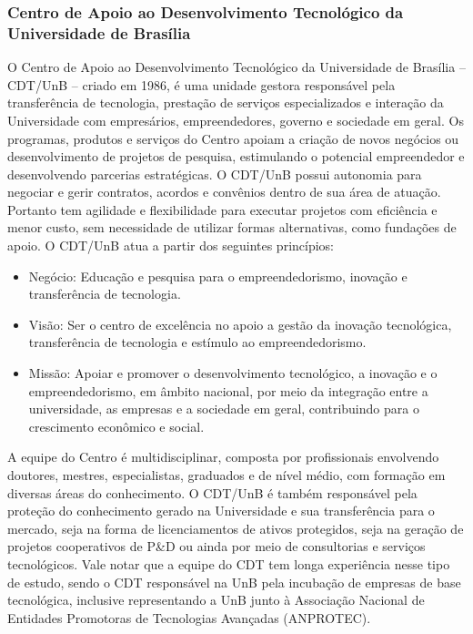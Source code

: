 \subsubsection*{Centro de Apoio ao Desenvolvimento Tecnológico da Universidade de Brasília}
O Centro de Apoio ao Desenvolvimento Tecnológico da Universidade de Brasília –
CDT/UnB – criado em 1986, é uma unidade gestora responsável pela transferência
de tecnologia, prestação de serviços especializados e interação da Universidade
com empresários, empreendedores, governo e sociedade em geral. Os programas,
produtos e serviços do Centro apoiam a criação de novos negócios ou
desenvolvimento de projetos de pesquisa, estimulando o potencial empreendedor e
desenvolvendo parcerias estratégicas.  O CDT/UnB possui autonomia para negociar
e gerir contratos, acordos e convênios dentro de sua área de atuação. Portanto
tem agilidade e flexibilidade para executar projetos com eficiência e menor
custo, sem necessidade de utilizar formas alternativas, como fundações de
apoio.  O CDT/UnB atua a partir dos seguintes princípios:

\begin{itemize}

\item Negócio: Educação e pesquisa para o empreendedorismo, inovação e
transferência de tecnologia.

\item Visão: Ser o centro de excelência no apoio a gestão da inovação
tecnológica, transferência de tecnologia e estímulo ao empreendedorismo.

\item Missão: Apoiar e promover o desenvolvimento tecnológico, a inovação e o
empreendedorismo, em âmbito nacional, por meio da integração entre a
universidade, as empresas e a sociedade em geral, contribuindo para o
crescimento econômico e social.

\end{itemize}

A equipe do Centro é multidisciplinar, composta por profissionais envolvendo
doutores, mestres, especialistas, graduados e de nível médio, com formação em
diversas áreas do conhecimento. O CDT/UnB é também responsável pela proteção do
conhecimento gerado na Universidade e sua transferência para o mercado, seja na
forma de licenciamentos de ativos protegidos, seja na geração de projetos
cooperativos de P\&D ou ainda por meio de consultorias e serviços tecnológicos.
Vale notar que a equipe do CDT tem longa experiência nesse tipo de estudo,
sendo o CDT responsável na UnB pela incubação de empresas de base tecnológica,
inclusive representando a UnB junto à Associação Nacional de Entidades
Promotoras de Tecnologias Avançadas (ANPROTEC).

